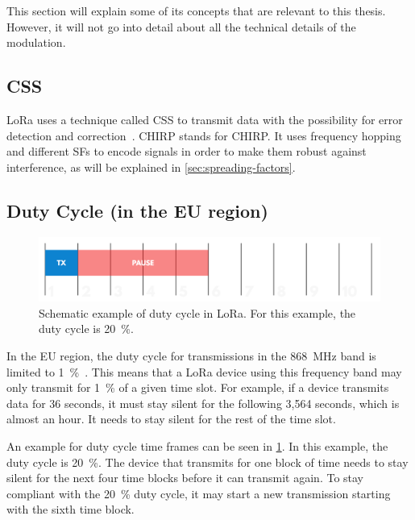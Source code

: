 This section will explain some of its concepts that are relevant to this thesis.
However, it will not go into detail about all the technical details of the modulation.

\subsection{\acf{CSS}}\label{sec:chirp-spread-spectrum}

\ac{LoRa} uses a technique called \acl{CSS} to transmit data with the possibility for error detection and correction~\cite{reynders_chirp_2016}.
\acs{CHIRP} stands for \acl{CHIRP}.
It uses frequency hopping and different \aclp{SF} to encode signals in order to make them robust against interference, as will be explained in \cref{sec:spreading-factors}.

\subsection{Duty Cycle (in the \acs{EU} region)}\label{sec:duty-cycle}

\begin{figure}[htbp]
    \centering
    \includegraphics[width=.8\textwidth]{pictures/lora/duty-cycle-single-channel-off-air.png}
    \caption{
        Schematic example of duty cycle in \ac{LoRa}.
        For this example, the duty cycle is \SI{20}{\percent}.~\protect\cite{the_things_industries_bv_duty_nodate}
    }\label{pic:lora-duty-cycle}
\end{figure}

In the \ac{EU} region, the duty cycle for transmissions in the \SI{868}{\mega\hertz} band is limited to \SI{1}{\percent}~\cite[p. 29]{etsi_etsi_2012}.
This means that a \ac{LoRa} device using this frequency band may only transmit for \SI{1}{\percent} of a given time slot.
For example, if a device transmits data for 36 seconds, it must stay silent for the following 3,564 seconds, which is almost an hour.
It needs to stay silent for the rest of the time slot.

An example for duty cycle time frames can be seen in \cref{pic:lora-duty-cycle}.
In this example, the duty cycle is \SI{20}{\percent}.
The device that transmits for one block of time needs to stay silent for the next four time blocks before it can transmit again.
To stay compliant with the \SI{20}{\percent} duty cycle, it may start a new transmission starting with the sixth time block.

